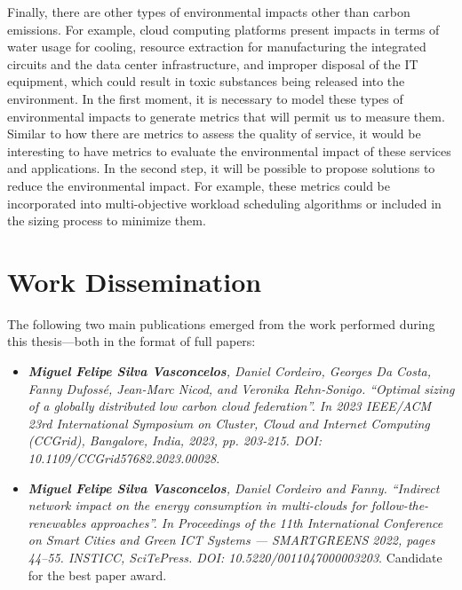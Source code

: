 Finally, there are other types of environmental impacts other than carbon emissions. For example, cloud computing platforms present impacts in terms of water usage for cooling, resource extraction for manufacturing the integrated circuits and the data center infrastructure, and improper disposal of the IT equipment, which could result in toxic substances being released into the environment. In the first moment, it is necessary to model these types of environmental impacts to generate metrics that will permit us to measure them. Similar to how there are metrics to assess the quality of service, it would be interesting to have metrics to evaluate the environmental impact of these services and applications. In the second step, it will be possible to propose solutions to reduce the environmental impact. For example, these metrics could be incorporated into multi-objective workload scheduling algorithms or included in the sizing process to minimize them.

\section{Work Dissemination}

\label{sec:conclusion_dissemination}

The following two main publications emerged from the work performed during this thesis---both in the format of full papers:

\begin{itemize}

\item  \textit{\textbf{Miguel Felipe Silva Vasconcelos}, Daniel Cordeiro, Georges Da Costa, Fanny Dufossé, Jean-Marc Nicod, and Veronika Rehn-Sonigo. ``Optimal sizing of a globally distributed low carbon cloud federation''. In 2023 IEEE/ACM 23rd International Symposium on Cluster, Cloud and Internet Computing (CCGrid), Bangalore, India, 2023, pp. 203-215. DOI: 10.1109/CCGrid57682.2023.00028}.
  
\item  \textit{\textbf{Miguel Felipe Silva Vasconcelos}, Daniel Cordeiro and Fanny. ``Indirect network impact on the energy consumption in multi-clouds for follow-the-renewables approaches''. In Proceedings of the 11th International Conference on Smart Cities and Green ICT Systems — SMARTGREENS 2022, pages 44–55. INSTICC, SciTePress. DOI: 10.5220/0011047000003203}. Candidate for the best paper award.

\end{itemize}

